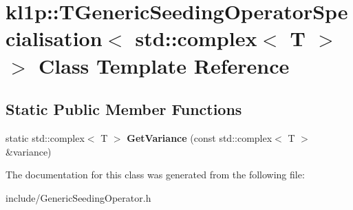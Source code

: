 \hypertarget{classkl1p_1_1TGenericSeedingOperatorSpecialisation_3_01std_1_1complex_3_01T_01_4_01_4}{}\section{kl1p\+:\+:T\+Generic\+Seeding\+Operator\+Specialisation$<$ std\+:\+:complex$<$ T $>$ $>$ Class Template Reference}
\label{classkl1p_1_1TGenericSeedingOperatorSpecialisation_3_01std_1_1complex_3_01T_01_4_01_4}
\subsection*{Static Public Member Functions}
\begin{DoxyCompactItemize}
\item 
static std\+::complex$<$ T $>$ {\bfseries Get\+Variance} (const std\+::complex$<$ T $>$ \&variance)\hypertarget{classkl1p_1_1TGenericSeedingOperatorSpecialisation_3_01std_1_1complex_3_01T_01_4_01_4_a5deddec1470776af8e2da87e293d7558}{}\label{classkl1p_1_1TGenericSeedingOperatorSpecialisation_3_01std_1_1complex_3_01T_01_4_01_4_a5deddec1470776af8e2da87e293d7558}

\end{DoxyCompactItemize}


The documentation for this class was generated from the following file\+:\begin{DoxyCompactItemize}
\item 
include/Generic\+Seeding\+Operator.\+h\end{DoxyCompactItemize}
